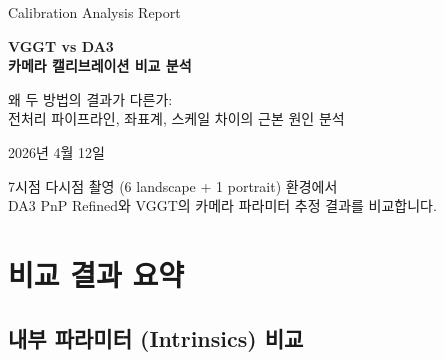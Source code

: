 \documentclass[11pt, a4paper]{report}
\begin{document}
\begin{titlepage}
\centering
\vspace*{1.5cm}
{\Large\color{gray} Calibration Analysis Report}
\vspace{0.5cm}

{\Huge\bfseries\color{defblue} VGGT vs DA3\\[0.3cm]
카메라 캘리브레이션 비교 분석}

\vspace{1cm}

{\LARGE\color{defblue!70!black} 왜 두 방법의 결과가 다른가:\\
전처리 파이프라인, 좌표계, 스케일 차이의 근본 원인 분석}

\vspace{3cm}
{\large 2026년 4월 12일}

\vspace{\fill}
{\small\color{gray} 7시점 다시점 촬영 (6 landscape + 1 portrait) 환경에서\\
DA3 PnP Refined와 VGGT의 카메라 파라미터 추정 결과를 비교합니다.}
\end{titlepage}

\tableofcontents
\newpage


\chapter{비교 결과 요약}

\section{내부 파라미터 (Intrinsics) 비교}
\end{document}
